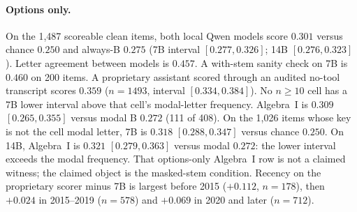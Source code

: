 \paragraph{Options only.}
On the 1{,}487 scoreable clean items, both local Qwen models score $0.301$ versus chance $0.250$ and always-B $0.275$ (7B interval $[0.277, 0.326]$; 14B $[0.276, 0.323]$). Letter agreement between models is $0.457$. A with-stem sanity check on 7B is $0.460$ on 200 items. A proprietary assistant scored through an audited no-tool transcript scores $0.359$ ($n=1493$, interval $[0.334, 0.384]$). No $n\ge 10$ cell has a 7B lower interval above that cell's modal-letter frequency. Algebra~I is $0.309$ $[0.265, 0.355]$ versus modal B $0.272$ (111 of 408). On the 1{,}026 items whose key is not the cell modal letter, 7B is $0.318$ $[0.288, 0.347]$ versus chance $0.250$. On 14B, Algebra~I is $0.321$ $[0.279, 0.363]$ versus modal $0.272$: the lower interval exceeds the modal frequency. That options-only Algebra~I row is not a claimed witness; the claimed object is the masked-stem condition. Recency on the proprietary scorer minus 7B is largest before 2015 ($+0.112$, $n=178$), then $+0.024$ in 2015--2019 ($n=578$) and $+0.069$ in 2020 and later ($n=712$).

